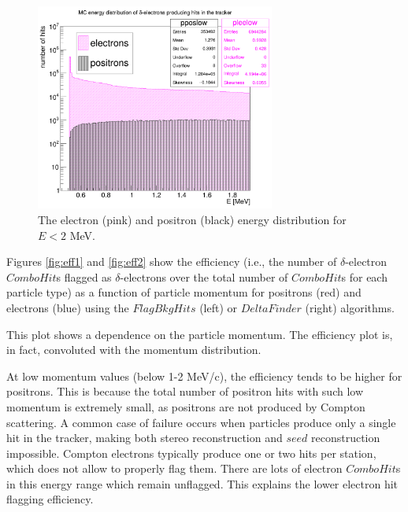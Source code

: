 \begin{figure}[!h]
    \centering
    \includegraphics[width =0.7\textwidth]{figures/png/Screenshot_20240820_154854.png}
    \caption[The electron and positron energy distribution for $E<2$ MeV.]{The electron (pink) and positron (black) 
    energy distribution for $E<2$ MeV.}
    \label{fig:detail}
\end{figure}

Figures \ref{fig:eff1} and \ref{fig:eff2} show the efficiency (i.e., the number of $\delta$-electron 
$ComboHit$s flagged as $\delta$-electrons over the total number of $ComboHit$s 
for each particle type) as a function of particle momentum for positrons (red) 
and electrons (blue) using the $FlagBkgHits$ (left) or $DeltaFinder$ (right) algorithms.


This plot shows a dependence on the particle momentum.
The efficiency plot is, in fact, convoluted with the momentum 
distribution. 

At low momentum values (below 1-2 MeV/c), the efficiency tends to be higher for positrons. 
This is because the total number of positron hits with 
such low momentum is extremely small, as positrons are not produced by  
Compton scattering. A common case of failure occurs when particles produce 
only a single hit in the tracker, making both stereo reconstruction and 
$seed$ reconstruction impossible. Compton electrons typically produce  
one or two hits per station, which does not allow to properly flag them. 
There are lots of electron $ComboHit$s in this energy range which remain 
unflagged. This explains the lower electron hit flagging efficiency.

